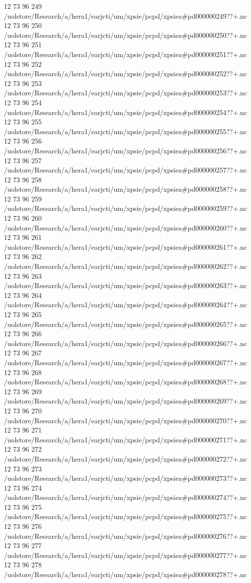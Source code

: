 12 73 96
249
/uolstore/Research/a/hera1/earjcti/um/xpsie/pcpd/xpsiea#pd000000249??+.nc
12 73 96
250
/uolstore/Research/a/hera1/earjcti/um/xpsie/pcpd/xpsiea#pd000000250??+.nc
12 73 96
251
/uolstore/Research/a/hera1/earjcti/um/xpsie/pcpd/xpsiea#pd000000251??+.nc
12 73 96
252
/uolstore/Research/a/hera1/earjcti/um/xpsie/pcpd/xpsiea#pd000000252??+.nc
12 73 96
253
/uolstore/Research/a/hera1/earjcti/um/xpsie/pcpd/xpsiea#pd000000253??+.nc
12 73 96
254
/uolstore/Research/a/hera1/earjcti/um/xpsie/pcpd/xpsiea#pd000000254??+.nc
12 73 96
255
/uolstore/Research/a/hera1/earjcti/um/xpsie/pcpd/xpsiea#pd000000255??+.nc
12 73 96
256
/uolstore/Research/a/hera1/earjcti/um/xpsie/pcpd/xpsiea#pd000000256??+.nc
12 73 96
257
/uolstore/Research/a/hera1/earjcti/um/xpsie/pcpd/xpsiea#pd000000257??+.nc
12 73 96
258
/uolstore/Research/a/hera1/earjcti/um/xpsie/pcpd/xpsiea#pd000000258??+.nc
12 73 96
259
/uolstore/Research/a/hera1/earjcti/um/xpsie/pcpd/xpsiea#pd000000259??+.nc
12 73 96
260
/uolstore/Research/a/hera1/earjcti/um/xpsie/pcpd/xpsiea#pd000000260??+.nc
12 73 96
261
/uolstore/Research/a/hera1/earjcti/um/xpsie/pcpd/xpsiea#pd000000261??+.nc
12 73 96
262
/uolstore/Research/a/hera1/earjcti/um/xpsie/pcpd/xpsiea#pd000000262??+.nc
12 73 96
263
/uolstore/Research/a/hera1/earjcti/um/xpsie/pcpd/xpsiea#pd000000263??+.nc
12 73 96
264
/uolstore/Research/a/hera1/earjcti/um/xpsie/pcpd/xpsiea#pd000000264??+.nc
12 73 96
265
/uolstore/Research/a/hera1/earjcti/um/xpsie/pcpd/xpsiea#pd000000265??+.nc
12 73 96
266
/uolstore/Research/a/hera1/earjcti/um/xpsie/pcpd/xpsiea#pd000000266??+.nc
12 73 96
267
/uolstore/Research/a/hera1/earjcti/um/xpsie/pcpd/xpsiea#pd000000267??+.nc
12 73 96
268
/uolstore/Research/a/hera1/earjcti/um/xpsie/pcpd/xpsiea#pd000000268??+.nc
12 73 96
269
/uolstore/Research/a/hera1/earjcti/um/xpsie/pcpd/xpsiea#pd000000269??+.nc
12 73 96
270
/uolstore/Research/a/hera1/earjcti/um/xpsie/pcpd/xpsiea#pd000000270??+.nc
12 73 96
271
/uolstore/Research/a/hera1/earjcti/um/xpsie/pcpd/xpsiea#pd000000271??+.nc
12 73 96
272
/uolstore/Research/a/hera1/earjcti/um/xpsie/pcpd/xpsiea#pd000000272??+.nc
12 73 96
273
/uolstore/Research/a/hera1/earjcti/um/xpsie/pcpd/xpsiea#pd000000273??+.nc
12 73 96
274
/uolstore/Research/a/hera1/earjcti/um/xpsie/pcpd/xpsiea#pd000000274??+.nc
12 73 96
275
/uolstore/Research/a/hera1/earjcti/um/xpsie/pcpd/xpsiea#pd000000275??+.nc
12 73 96
276
/uolstore/Research/a/hera1/earjcti/um/xpsie/pcpd/xpsiea#pd000000276??+.nc
12 73 96
277
/uolstore/Research/a/hera1/earjcti/um/xpsie/pcpd/xpsiea#pd000000277??+.nc
12 73 96
278
/uolstore/Research/a/hera1/earjcti/um/xpsie/pcpd/xpsiea#pd000000278??+.nc
